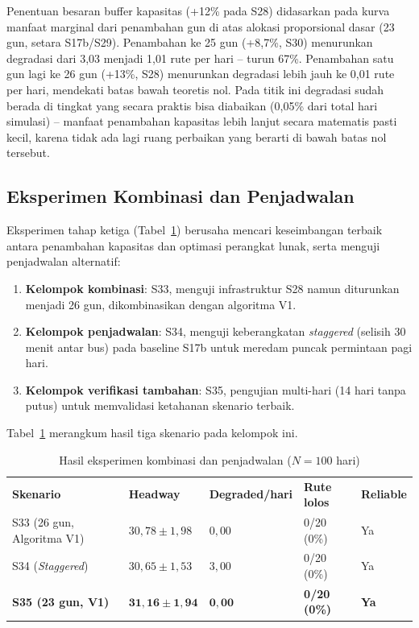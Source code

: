 Penentuan besaran buffer kapasitas (+12\% pada S28) didasarkan pada
kurva manfaat marginal dari penambahan gun di atas alokasi proporsional
dasar (23 gun, setara S17b/S29). Penambahan ke 25 gun (+8,7\%, S30)
menurunkan degradasi dari 3,03 menjadi 1,01 rute per hari -- turun 67\%.
Penambahan satu gun lagi ke 26 gun (+13\%, S28) menurunkan degradasi
lebih jauh ke 0,01 rute per hari, mendekati batas bawah teoretis nol.
Pada titik ini degradasi sudah berada di tingkat yang secara praktis
bisa diabaikan (0,05\% dari total hari simulasi) -- manfaat penambahan
kapasitas lebih lanjut secara matematis pasti kecil, karena tidak ada
lagi ruang perbaikan yang berarti di bawah batas nol tersebut.

\subsection{Eksperimen Kombinasi dan Penjadwalan}

Eksperimen tahap ketiga (Tabel~\ref{tab:eval-s33-s35-2}) berusaha mencari
keseimbangan terbaik antara penambahan kapasitas dan optimasi perangkat
lunak, serta menguji penjadwalan alternatif:
\begin{enumerate}
	\item \textbf{Kelompok kombinasi}: S33, menguji infrastruktur S28
	namun diturunkan menjadi 26 gun, dikombinasikan dengan algoritma V1.
	\item \textbf{Kelompok penjadwalan}: S34, menguji keberangkatan \textit{staggered}
	(selisih 30 menit antar bus) pada baseline S17b untuk meredam
	puncak permintaan pagi hari.
	\item \textbf{Kelompok verifikasi tambahan}: S35, pengujian multi-hari
	(14 hari tanpa putus) untuk memvalidasi ketahanan skenario terbaik.
\end{enumerate}

Tabel~\ref{tab:eval-s33-s35-2} merangkum hasil tiga skenario pada kelompok
ini.

\begin{table}[ht]
	\centering
	\caption{Hasil eksperimen kombinasi dan penjadwalan ($N=100$ hari)}
	\label{tab:eval-s33-s35-2}
	\begin{tabularx}{\linewidth}{|X|l|l|l|l|}
		\hline
		\textbf{Skenario} & \textbf{Headway} & \textbf{Degraded/hari} & \textbf{Rute lolos} & \textbf{Reliable} \\
		S33 (26 gun, Algoritma V1) & $30{,}78 \pm 1{,}98$ & $0{,}00$ & 0/20 (0\%) & Ya \\
		\hline
		S34 (\textit{Staggered}) & $30{,}65 \pm 1{,}53$ & $3{,}00$ & 0/20 (0\%) & Ya \\
		\hline
		\textbf{S35 (23 gun, V1)} & $\mathbf{31{,}16 \pm 1{,}94}$ & $\mathbf{0{,}00}$ & \textbf{0/20 (0\%)} & \textbf{Ya} \\
		\hline
	\end{tabularx}
\end{table}

